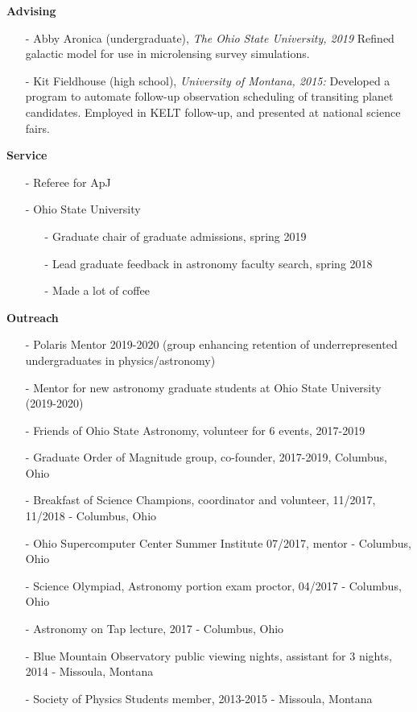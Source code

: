 \documentclass{article}
\begin{document}
{\large{\bf Advising}}
\begin{itemize}
\item[-]Abby Aronica (undergraduate), \textit{The Ohio State University, 2019} Refined galactic model for use in microlensing survey simulations. 
\item[-]Kit Fieldhouse (high school), \textit{University of Montana, 2015:} Developed a program to automate follow-up observation scheduling of transiting planet candidates. Employed in KELT follow-up, and presented at national science fairs. 
\end{itemize}



{\large{\bf Service}}
\begin{itemize}
\item[-]Referee for ApJ
\item[-]Ohio State University
\begin{itemize}
    \item[-]Graduate chair of graduate admissions, spring 2019
    \item[-]Lead graduate feedback in astronomy faculty search, spring 2018 
    \item[-]Made a lot of coffee
\end{itemize}
\end{itemize}

{\large{\bf Outreach}}
\begin{itemize}
\item[-] Polaris Mentor 2019-2020 (group enhancing retention of underrepresented undergraduates in physics/astronomy)
\item[-] Mentor for new astronomy graduate students at Ohio State University (2019-2020)
\item[-] Friends of Ohio State Astronomy, volunteer for 6 events, 2017-2019
\item[-] Graduate Order of Magnitude group, co-founder, 2017-2019, Columbus, Ohio  
\item[-] Breakfast of Science Champions, coordinator and volunteer, 11/2017, 11/2018 - Columbus, Ohio
\item[-] Ohio Supercomputer Center Summer Institute 07/2017, mentor - Columbus, Ohio
\item[-] Science Olympiad, Astronomy portion exam proctor, 04/2017 - Columbus, Ohio
\item[-] Astronomy on Tap lecture, 2017 - Columbus, Ohio 
\item[-] Blue Mountain Observatory public viewing nights, assistant for 3 nights, 2014 - Missoula, Montana
\item[-] Society of Physics Students member, 2013-2015 - Missoula, Montana
\end{itemize}
\end{document}
